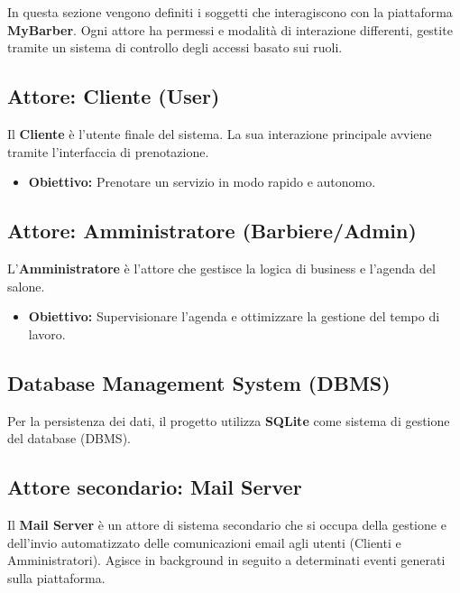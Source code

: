 \documentclass[12pt,a4paper]{article}
\begin{document}
In questa sezione vengono definiti i soggetti che interagiscono con la piattaforma \textbf{MyBarber}. Ogni attore ha permessi e modalità di interazione differenti, gestite tramite un sistema di controllo degli accessi basato sui ruoli.

\subsection{Attore: Cliente (User)}
Il \textbf{Cliente} è l'utente finale del sistema. La sua interazione principale avviene tramite l'interfaccia di prenotazione.
\begin{itemize}
    \item \textbf{Obiettivo:} Prenotare un servizio in modo rapido e autonomo.
 
\end{itemize}

\subsection{Attore: Amministratore (Barbiere/Admin)}
L'\textbf{Amministratore} è l'attore che gestisce la logica di business e l'agenda del salone.
\begin{itemize}
    \item \textbf{Obiettivo:} Supervisionare l'agenda e ottimizzare la gestione del tempo di lavoro.

\end{itemize}

\subsection{Database Management System (DBMS)}

Per la persistenza dei dati, il progetto utilizza \textbf{SQLite} come sistema di gestione del database (DBMS).

\subsection{Attore secondario: Mail Server}
Il \textbf{Mail Server} è un attore di sistema secondario che si occupa della gestione e dell'invio automatizzato delle comunicazioni email agli utenti (Clienti e Amministratori). Agisce in background in seguito a determinati eventi generati sulla piattaforma.
\end{document}
